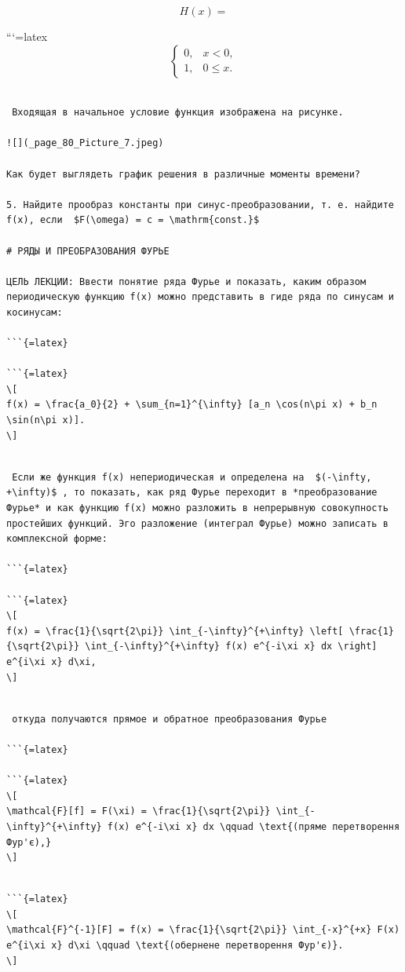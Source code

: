 \documentclass[
  ukrainian,
]{article}
\begin{document}
\[
H(x) =
\]

```{=latex}
\[
\begin{cases} 0, & x < 0, \\ 1, & 0 \le x. \end{cases}
\]

\begin{verbatim}

 Входящая в начальное условие функция изображена на рисунке.

![](_page_80_Picture_7.jpeg)

Как будет выглядеть график решения в различные моменты времени?

5. Найдите прообраз константы при синус-преобразовании, т. е. найдите f(x), если  $F(\omega) = c = \mathrm{const.}$ 

# РЯДЫ И ПРЕОБРАЗОВАНИЯ ФУРЬЕ

ЦЕЛЬ ЛЕКЦИИ: Ввести понятие ряда Фурье и показать, каким образом периодическую функцию f(x) можно представить в гиде ряда по синусам и косинусам:

```{=latex}

```{=latex}
\[
f(x) = \frac{a_0}{2} + \sum_{n=1}^{\infty} [a_n \cos(n\pi x) + b_n \sin(n\pi x)].
\]
\end{verbatim}

\begin{verbatim}

 Если же функция f(x) непериодическая и определена на  $(-\infty, +\infty)$ , то показать, как ряд Фурье переходит в *преобразование Фурье* и как функцию f(x) можно разложить в непрерывную совокупность простейших функций. Эго разложение (интеграл Фурье) можно записать в комплексной форме:

```{=latex}

```{=latex}
\[
f(x) = \frac{1}{\sqrt{2\pi}} \int_{-\infty}^{+\infty} \left[ \frac{1}{\sqrt{2\pi}} \int_{-\infty}^{+\infty} f(x) e^{-i\xi x} dx \right] e^{i\xi x} d\xi,
\]
\end{verbatim}

\begin{verbatim}

 откуда получаются прямое и обратное преобразования Фурье

```{=latex}

```{=latex}
\[
\mathcal{F}[f] = F(\xi) = \frac{1}{\sqrt{2\pi}} \int_{-\infty}^{+\infty} f(x) e^{-i\xi x} dx \qquad \text{(пряме перетворення Фур'є),}
\]
\end{verbatim}

\begin{verbatim}

```{=latex}
\[
\mathcal{F}^{-1}[F] = f(x) = \frac{1}{\sqrt{2\pi}} \int_{-x}^{+x} F(x) e^{i\xi x} d\xi \qquad \text{(обернене перетворення Фур'є)}.
\]
\end{verbatim}
\end{document}
